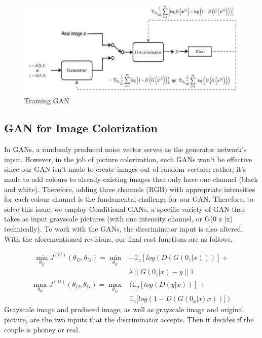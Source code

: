 \documentclass[conference]{IEEEtran}
\begin{document}
\begin{figure}[h]
\centerline{\includegraphics[width=\linewidth]{Traning-GAN}}
\caption{Training GAN}
\label{fig}
\end{figure}

\subsection{GAN for Image Colorization}\label{GAN for Image Colorization}
In GANs, a randomly produced noise vector serves as the generator network's input. However, in the job of picture colorization, such GANs won't be effective since our GAN isn't made to create images out of random vectors; rather, it's made to add colours to already-existing images that only have one channel (black and white). Therefore, adding three channels (RGB) with appropriate intensities for each colour channel is the fundamental challenge for our GAN. Therefore, to solve this issue, we employ Conditional GANs, a specific variety of GAN that takes as input grayscale pictures (with one intensity channel, or G(0 z |x) technically). To work with the GANs, the discriminator input is also altered. With the aforementioned revisions, our final cost functions are as follows.

\begin{equation}
\begin{split}
\min \limits_{\theta_{G}} J^{(G)}(\theta_{D},\theta_{G}) = \min \limits_{\theta_{G}}&-\mathbb{E}_z[log(D(G(0_z|x)))]+ \\& \lambda\parallel G(0_z|x)-y\parallel 1
\end{split}
\end{equation}
\begin{equation}
\begin{split}
\max \limits_{\theta_{G}} J^{(D)}(\theta_{D},\theta_{G}) =  \max \limits_{\theta_{D}}&(\mathbb{E}_y[log(D(y|x))]+ \\& \mathbb{E}_z[log(1-D(G(0_x|x)|x))])
\end{split}
\end{equation}
Grayscale image and produced image, as well as grayscale image and original picture, are the two inputs that the discriminator accepts. Then it decides if the couple is phoney or real.
\end{document}
